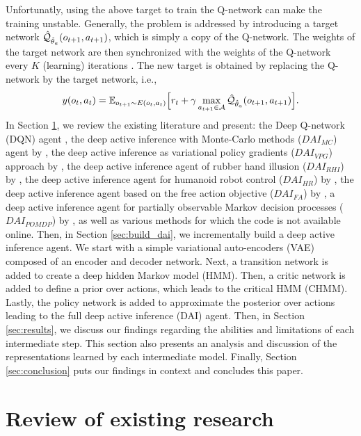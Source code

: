 \documentclass[twoside,11pt]{article}
\let\oldmathcal\mathcal
\renewcommand{\mathcal}[1]{%
  \IfSubStr{ABCDEFGHIJKLMNOPQRSTUVWXYZ}{#1}{\oldmathcal{#1}}{\mathdutchcal{#1}}
}
\begin{document}
Unfortunatly, using the above target to train the Q-network can make the training unstable. Generally, the problem is addressed by introducing a target network $\hat{\mathcal{Q}}_{\hat{\theta}_a}(o_{t+1}, a_{t+1})$, which is simply a copy of the Q-network. The weights of the target network are then synchronized with the weights of the Q-network every $K$ (learning) iterations \citep{DeepRL}. The new target is obtained by replacing the Q-network by the target network, i.e.,
$$y(o_t,a_t) = \mathbb{E}_{o_{t+1} \sim E(o_t,a_t)}\Big[ r_t + \gamma \max_{a_{t+1} \in \mathcal{A}} \hat{\mathcal{Q}}_{\hat{\theta}_a}(o_{t+1}, a_{t+1})\Big].$$
In Section \ref{sec:existing_research}, we review the existing literature and present: the Deep Q-network (DQN) agent \citep{DeepRL}, the deep active inference with Monte-Carlo methods ($DAI_{MC}$) agent by \citet{DeepAIwithMCMC}, the deep active inference as variational policy gradients ($DAI_{VPG}$) approach by \citet{DeepAI}, the deep active inference agent of rubber hand illusion ($DAI_{RHI}$) by \citet{rood2020deep}, the deep active inference agent for humanoid robot control ($DAI_{HR}$) by \citet{sancaktar2020endtoend,DAI_HR,DAI_HR2}, the deep active inference agent based on the free action objective ($DAI_{FA}$) by \citet{DAI_Kai}, a deep active inference agent for partially observable Markov decision processes ($DAI_{POMDP}$) by \citet{DAI_POMDP}, as well as various methods for which the code is not available online. Then, in Section \ref{sec:build_dai}, we incrementally build a deep active inference agent. We start with a simple variational auto-encoders (VAE) composed of an encoder and decoder network. Next, a transition network is added to create a deep hidden Markov model (HMM). Then, a critic network is added to define a prior over actions, which leads to the critical HMM (CHMM). Lastly, the policy network is added to approximate the posterior over actions leading to the full deep active inference (DAI) agent. Then, in Section \ref{sec:results}, we discuss our findings regarding the abilities and limitations of each intermediate step. This section also presents an analysis and discussion of the representations learned by each intermediate model. Finally, Section \ref{sec:conclusion} puts our findings in context and concludes this paper.

\section{Review of existing research} \label{sec:existing_research}
\end{document}
